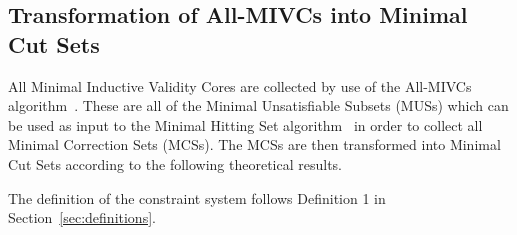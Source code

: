 \subsection{Transformation of All-MIVCs into Minimal Cut Sets}
\label{sec:transformation}
All Minimal Inductive Validity Cores are collected by use of the All-MIVCs algorithm~\cite{Ghassabani2017EfficientGO}. These are all of the Minimal Unsatisfiable Subsets (MUSs) which can be used as input to the Minimal Hitting Set algorithm~\cite{murakami2013efficient,gainer2017minimal} in order to collect all Minimal Correction Sets (MCSs). The MCSs are then transformed into Minimal Cut Sets according to the following theoretical results. 

The definition of the constraint system follows Definition 1 in Section~\ref{sec:definitions}.

